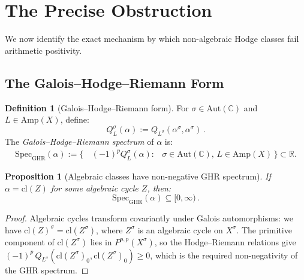 \documentclass[aps,prd,twocolumn,superscriptaddress,nofootinbib]{revtex4-2}
\newtheorem{proposition}[theorem]{Proposition}
\theoremstyle{definition}
\newtheorem{definition}[theorem]{Definition}
\theoremstyle{remark}
\def\\{ }%
\begin{document}
\section{The Precise Obstruction}
\label{sec:obstruction}

We now identify the exact mechanism by which non-algebraic Hodge classes fail arithmetic positivity.

\subsection{The Galois--Hodge--Riemann Form}

\begin{definition}[Galois--Hodge--Riemann form]
\label{def:galois_HR}
For $\sigma \in \mathrm{Aut}(\mathbb{C})$ and $L \in \mathrm{Amp}(X)$, define:
\begin{equation}
Q_L^\sigma(\alpha) := Q_{L^\sigma}(\alpha^\sigma, \alpha^\sigma)\,.
\label{eq:galois_HR}
\end{equation}
The \textit{Galois--Hodge--Riemann spectrum} of $\alpha$ is:
\begin{equation}
\begin{aligned}
\mathrm{Spec}_{\mathrm{GHR}}(\alpha)
:= \{\, &(-1)^p Q_L^\sigma(\alpha) :\\
&\sigma \in \mathrm{Aut}(\mathbb{C}),\,
  L \in \mathrm{Amp}(X)\,\} \subset \mathbb{R}.
\end{aligned}
\end{equation}
\end{definition}

\begin{proposition}[Algebraic classes have non-negative GHR spectrum]
\label{prop:ghr_positive}
If $\alpha = \mathrm{cl}(Z)$ for some algebraic cycle $Z$, then:
\begin{equation}
\mathrm{Spec}_{\mathrm{GHR}}(\alpha) \subseteq [0, \infty)\,.
\end{equation}
\end{proposition}

\begin{proof}
Algebraic cycles transform covariantly under Galois automorphisms: we have $\mathrm{cl}(Z)^\sigma = \mathrm{cl}(Z^\sigma)$, where $Z^\sigma$ is an algebraic cycle on $X^\sigma$. The primitive component of $\mathrm{cl}(Z^\sigma)$ lies in $P^{p,p}(X^\sigma)$, so the Hodge--Riemann relations give $(-1)^p\, Q_{L^\sigma}(\mathrm{cl}(Z^\sigma)_0, \mathrm{cl}(Z^\sigma)_0) \geq 0$, which is the required non-negativity of the GHR spectrum.
\end{proof}
\end{document}
